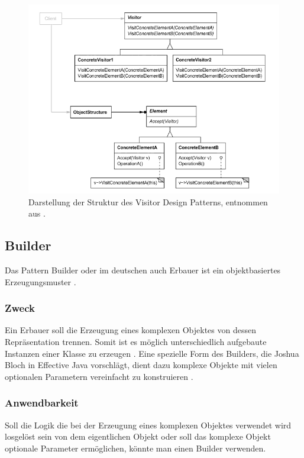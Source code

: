 \documentclass[12pt,oneside,a4paper,parskip]{scrbook}
\begin{document}
\begin{figure}[htbp]
	\centering
	\includegraphics[width=1.0\textwidth]{bilder/visitor}
	\caption{Darstellung der Struktur des Visitor Design Patterns, entnommen aus \cite[S. 485]{gamma2015}.}
	\label{fig:visitor}
\end{figure}

\subsection{Builder}

Das Pattern Builder oder im deutschen auch Erbauer ist ein objektbasiertes Erzeugungsmuster \cite[S. 159]{gamma2015}.

\subsubsection{Zweck}

Ein Erbauer soll die Erzeugung eines komplexen Objektes von dessen Repräsentation trennen. Somit ist es möglich unterschiedlich aufgebaute Instanzen einer Klasse zu erzeugen \cite[S. 159]{gamma2015}. Eine spezielle Form des Builders, die Joshua Bloch in Effective Java vorschlägt, dient dazu komplexe Objekte mit vielen optionalen Parametern vereinfacht zu konstruieren \cite[S. 10ff.]{bloch2017}. 

\subsubsection{Anwendbarkeit}

Soll die Logik die bei der Erzeugung eines komplexen Objektes verwendet wird losgelöst sein von dem eigentlichen Objekt oder soll das komplexe Objekt optionale Parameter ermöglichen, könnte man einen Builder verwenden.
\end{document}
